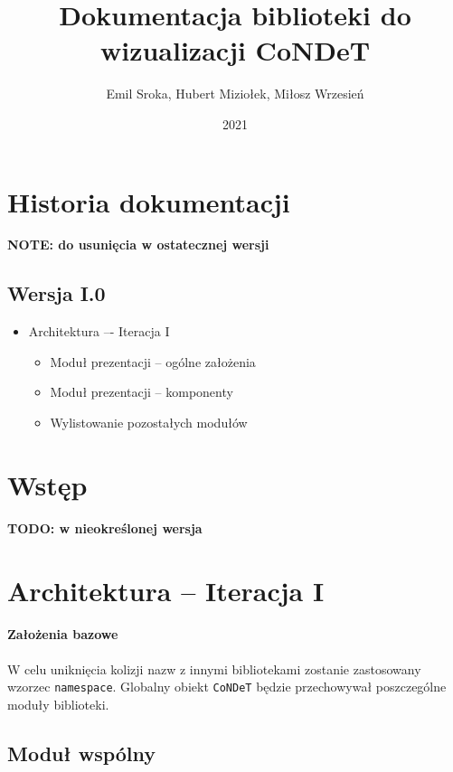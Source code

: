 \documentclass{article}
\title{Dokumentacja biblioteki do wizualizacji CoNDeT}
\author{Emil Sroka, Hubert Miziołek, Miłosz Wrzesień}
\date{2021}
\def\code#1{\texttt{#1}}
\begin{document}
\maketitle

\tableofcontents

\clearpage

\section{Historia dokumentacji}
\textbf{NOTE: do usunięcia w ostatecznej wersji}

\subsection{Wersja I.0}
\begin{itemize}
    \item Architektura –- Iteracja I
    \begin{itemize}
        \item Moduł prezentacji -- ogólne założenia
        \item Moduł prezentacji -- komponenty
        \item Wylistowanie pozostałych modułów
    \end{itemize}
\end{itemize}

\clearpage

\section{Wstęp}
\textbf{TODO: w nieokreślonej wersja}

\section{Architektura -- Iteracja I}

\paragraph{Założenia bazowe}

W celu uniknięcia kolizji nazw z innymi bibliotekami zostanie zastosowany wzorzec \code{namespace}. Globalny obiekt \code{CoNDeT} będzie przechowywał poszczególne moduły biblioteki.

\subsection{Moduł wspólny}
\end{document}
